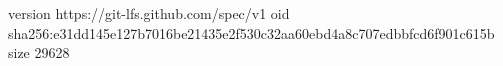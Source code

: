 version https://git-lfs.github.com/spec/v1
oid sha256:e31dd145e127b7016be21435e2f530c32aa60ebd4a8c707edbbfcd6f901c615b
size 29628
